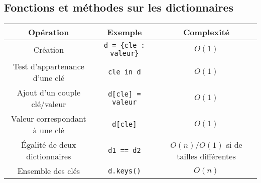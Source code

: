 \documentclass[10pt]{article}
\begin{document}
\subsection*{Fonctions et méthodes sur les dictionnaires}


\begin{tabular}{|c|c|c|}
  \hline
  Opération & Exemple & Complexité \\
  \hline 
  \hline 
  Création & \verb+d = {cle : valeur}+ & $O(1)$\\
  \hline
  Test d'appartenance d'une clé & \verb+cle in d+ & $O(1)$\\
  \hline
  Ajout d'un couple clé/valeur & \verb+d[cle] = valeur+ & $O(1)$\\
  \hline
  Valeur correspondant à une clé & \verb+d[cle]+ & $O(1)$\\
  \hline
  Égalité de deux dictionnaires &  \verb+d1 == d2+ & $O(n)/O(1)$ si de tailles différentes\\
  \hline
  Ensemble des clés & \verb+d.keys()+ & $O(n)$\\
  \hline
\end{tabular}
\end{document}
